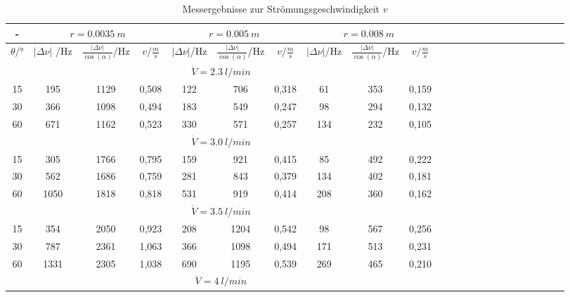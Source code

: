 

\begin{table}[h!]
  \centering
  \caption{Messergebnisse zur Strömungsgeschwindigkeit $v$}
  \label{tab:v}
  \begin{tabular}{c c c c c c c c c c c c c c c c c c c c c c c}
    \toprule
          -   &  \multicolumn{3}{c}{$r=\SI{0.0035}{m}$} & \multicolumn{3}{c}{$r=\SI{0.005}{m}$} & \multicolumn{3}{c}{$r=\SI{0.008}{m}$}\\
      \midrule
    $\theta/°$ & $ \vert \Delta \nu \vert$ /Hz & $\frac{\vert \Delta \nu \vert}{\cos{(\alpha)}}$/Hz & $v/\frac{m}{s}$ &    $\vert \Delta \nu \vert$/Hz & $\frac{\vert \Delta \nu \vert} {\cos{(\alpha)}}$/Hz & $v/\frac{m}{s}$ & $\vert \Delta \nu \vert$/Hz & $\frac{\vert \Delta \nu \vert}{\cos{(\alpha)}}$/Hz &$v/\frac{m}{s}$\\
      \midrule
      \multicolumn{10}{c}{$\dot{V}=\SI{2,3}{l/min}$}\\
      \midrule
    15	&     195   & 1129 &  0,508  &     122  & 706  &  0,318  &      61   & 353 &  0,159 \\
    30	&     366   & 1098 &  0,494  &     183  & 549  &  0,247  &      98   & 294 &  0,132 \\
    60	&     671   & 1162 &  0,523  &     330  & 571  &  0,257  &     134   & 232 &  0,105 \\
      \midrule
      \multicolumn{10}{c}{$\dot{V}=\SI{3,0}{l/min}$}\\
      \midrule
    15	&     305   & 1766 &  0,795  &     159  & 921  &  0,415  &      85   & 492 &  0,222 \\
    30	&     562   & 1686 &  0,759  &     281  & 843  &  0,379  &     134   & 402 &  0,181 \\
    60	&     1050  & 1818 &  0,818  &     531  & 919  &  0,414  &     208   & 360 &  0,162 \\
      \midrule
      \multicolumn{10}{c}{$\dot{V}=\SI{3,5}{l/min}$}\\
      \midrule
    15	&     354   & 2050 &  0,923  &     208  & 1204  &  0,542  &    98    & 567 &  0,256 \\
    30	&     787   & 2361 &  1,063  &     366  & 1098  &  0,494  &    171   & 513 &  0,231 \\
    60	&     1331  & 2305 &  1,038  &     690  & 1195  &  0,539  &    269   & 465 &  0,210 \\
      \midrule
      \multicolumn{10}{c}{$\dot{V}=\SI{4}{l/min}$}\\

\end{tabular}
\end{table}
